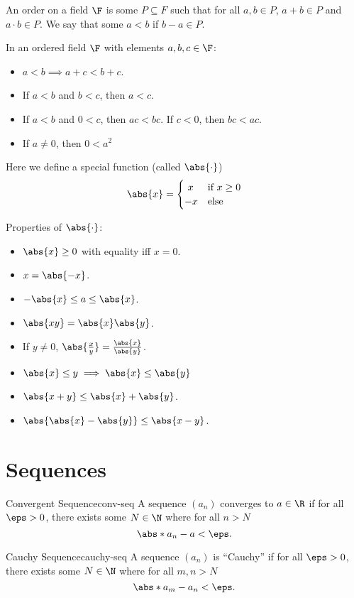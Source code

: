 \documentclass{article}
\begin{document}
An order on a field $\F$ is some $P \subseteq F$ such that
for all $a, b \in P$, $a + b \in P$ and $a \cdot b \in P$.
We say that some $a < b$ if $b - a \in P$.

\begin{prop}\label{prop:ordered-field-properties}
  In an ordered field $\F$ with elements $a, b, c \in \F$:
  \begin{itemize}
          \item $a < b \implies a + c < b + c$.
          \item If $a < b$ and $b < c$, then $a < c$.
          \item If $a < b$ and $0 < c$, then $ac < bc$.
          If $c < 0$, then $bc < ac$.
          \item If $a \ne 0$, then $0 < a^{2}$
  \end{itemize}
\end{prop}

Here we define a special function (called $\abs{\cdot}$)
\begin{equation}\label{eq:abs-value}
  \abs{x} = \begin{cases}
              \ x& \textrm{if } x \ge 0\\
              -x& \textrm{else}
            \end{cases}
\end{equation}

Properties of $\abs{\cdot}$:
\begin{itemize}
        \item $\abs{x} \ge 0$ with equality iff $x = 0$.
        \item $x = \abs{-x}$.
        \item $-\abs{x} \le a \le \abs{x}$.
        \item $\abs{xy} = \abs{x}\abs{y}$.
        \item If $y \ne 0$, $\abs{\frac{x}{y}} = \frac{\abs{x}}{\abs{y}}$.
        \item $\abs{x} \le y \implies \abs{x} \le \abs{y}$
        \item $\abs{x + y} \le \abs{x} + \abs{y}$.
        \item $\abs{\abs{x} - \abs{y}} \le \abs{x - y}$.
\end{itemize}


\section{Sequences}

\begin{defn}{Convergent Sequence}{conv-seq}
  A sequence $(a_{n})$ converges to $a \in \R$ if for all $\eps > 0$, there exists some $N \in \N$
  where for all $n > N$
  \[
    \abs*{a_{n} - a} < \eps.
  \]
\end{defn}
\begin{defn}{Cauchy Sequence}{cauchy-seq}
  A sequence $(a_{n})$ is ``Cauchy'' if for all $\eps > 0$, there exists some $N \in \N$
  where for all $m, n > N$
  \[
    \abs*{a_{m} - a_{n}} < \eps.
  \]
\end{defn}
\end{document}
